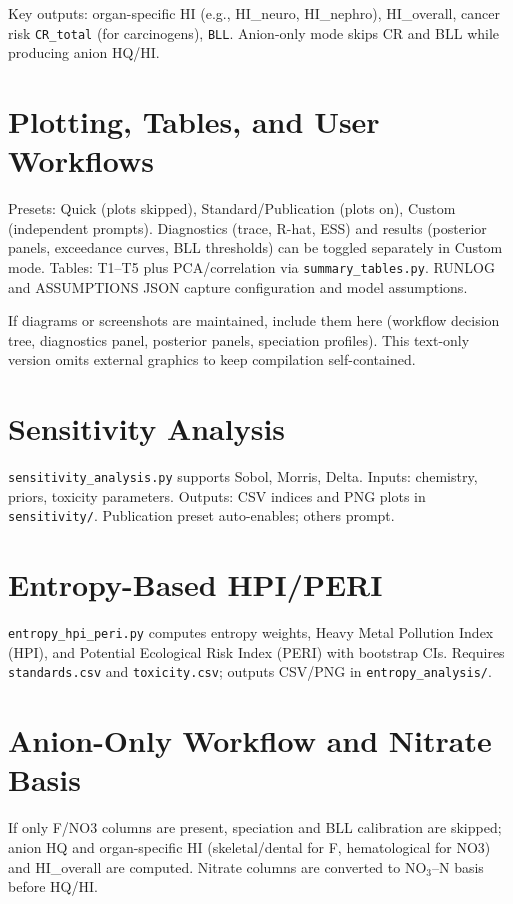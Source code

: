 \documentclass[11pt,a4paper]{article}
\begin{document}
Key outputs: organ-specific HI (e.g., HI\_neuro, HI\_nephro), HI\_overall, cancer risk \texttt{CR\_total} (for carcinogens), \texttt{BLL}. Anion-only mode skips CR and BLL while producing anion HQ/HI.

\section{Plotting, Tables, and User Workflows}\label{sec:outputs}
Presets: Quick (plots skipped), Standard/Publication (plots on), Custom (independent prompts). Diagnostics (trace, R-hat, ESS) and results (posterior panels, exceedance curves, BLL thresholds) can be toggled separately in Custom mode. Tables: T1–T5 plus PCA/correlation via \texttt{summary\_tables.py}. RUNLOG and ASSUMPTIONS JSON capture configuration and model assumptions.

If diagrams or screenshots are maintained, include them here (workflow decision tree, diagnostics panel, posterior panels, speciation profiles). This text-only version omits external graphics to keep compilation self-contained.

\section{Sensitivity Analysis}
\texttt{sensitivity\_analysis.py} supports Sobol, Morris, Delta. Inputs: chemistry, priors, toxicity parameters. Outputs: CSV indices and PNG plots in \texttt{sensitivity/}. Publication preset auto-enables; others prompt.

\section{Entropy-Based HPI/PERI}
\texttt{entropy\_hpi\_peri.py} computes entropy weights, Heavy Metal Pollution Index (HPI), and Potential Ecological Risk Index (PERI) with bootstrap CIs. Requires \texttt{standards.csv} and \texttt{toxicity.csv}; outputs CSV/PNG in \texttt{entropy\_analysis/}.

\section{Anion-Only Workflow and Nitrate Basis}
If only F/NO3 columns are present, speciation and BLL calibration are skipped; anion HQ and organ-specific HI (skeletal/dental for F, hematological for NO3) and HI\_overall are computed. Nitrate columns are converted to NO$_3$--N basis before HQ/HI.
\end{document}
